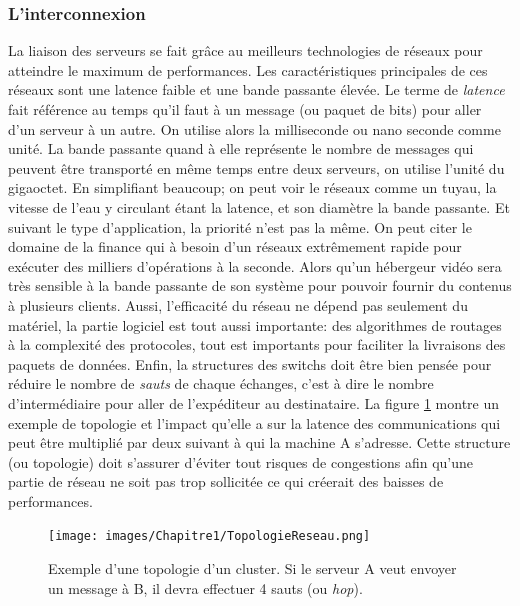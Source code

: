 
\subsubsection{L'interconnexion } 
La liaison des serveurs se fait grâce au meilleurs technologies de réseaux pour atteindre le maximum de performances. Les caractéristiques principales de ces réseaux sont une latence faible et une bande passante élevée. Le terme de \textit{latence} fait référence au temps qu'il faut à un message (ou paquet de bits) pour aller d'un serveur à un autre. On utilise alors la milliseconde ou nano seconde comme unité. La bande passante quand à elle représente le nombre de messages qui peuvent être transporté en même temps entre deux serveurs, on utilise l'unité du gigaoctet. En simplifiant beaucoup; on peut voir le réseaux comme un tuyau, la vitesse de l'eau y circulant étant la latence, et son diamètre la bande passante. Et suivant le type d'application, la priorité n'est pas la même. On peut citer le domaine de la finance qui à besoin d'un réseaux extrêmement rapide pour exécuter des milliers d'opérations à la seconde. Alors qu'un hébergeur vidéo sera très sensible à la bande passante de son système pour pouvoir fournir du contenus à plusieurs clients.
Aussi, l'efficacité du réseau ne dépend pas seulement du matériel, la partie logiciel est tout aussi importante: des algorithmes de routages à la complexité des protocoles, tout est importants pour faciliter la livraisons des paquets de données. Enfin, la structures des switchs doit être bien pensée pour réduire le nombre de \textit{sauts} de chaque échanges, c'est à dire le nombre d'intermédiaire pour aller de l'expéditeur au destinataire. La figure \ref{pic_topologie} montre un exemple de topologie et l'impact qu'elle a sur la latence des communications qui peut être multiplié par deux suivant à qui la machine A s'adresse. Cette structure (ou topologie) doit s'assurer d'éviter tout risques de congestions afin qu'une partie de réseau ne soit pas trop sollicitée ce qui créerait des baisses de performances. 

\begin{figure}
    \center
    \texttt{[image: images/Chapitre1/TopologieReseau.png]}
    \caption{\label{pic_topologie} Exemple d'une topologie d'un cluster. Si le serveur A veut envoyer un message à B, il devra effectuer 4 sauts (ou \textit{hop}).}
\end{figure}


